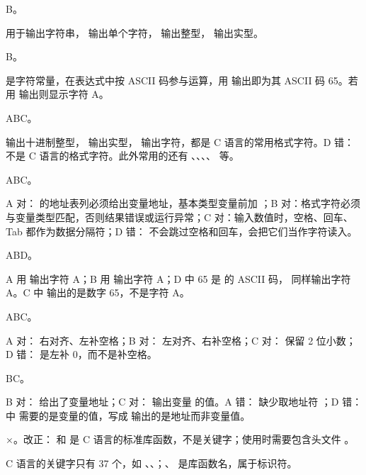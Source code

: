 \documentclass[a4paper,11pt]{article}
\begin{document}
\q B。\begin{analysis} 用于输出字符串， 输出单个字符， 输出整型， 输出实型。\end{analysis}

\q B。\begin{analysis} 是字符常量，在表达式中按 ASCII 码参与运算，用  输出即为其 ASCII 码 65。若用  输出则显示字符 A。\end{analysis}


\q ABC。\begin{analysis} 输出十进制整型， 输出实型， 输出字符，都是 C 语言的常用格式字符。D 错： 不是 C 语言的格式字符。此外常用的还有 、、、、 等。\end{analysis}

\q ABC。\begin{analysis}A 对： 的地址表列必须给出变量地址，基本类型变量前加 \code{\&}；B 对：格式字符必须与变量类型匹配，否则结果错误或运行异常；C 对：输入数值时，空格、回车、Tab 都作为数据分隔符；D 错： 不会跳过空格和回车，会把它们当作字符读入。\end{analysis}

\q ABD。\begin{analysis}A 用  输出字符 A；B 用  输出字符 A；D 中 65 是  的 ASCII 码， 同样输出字符 A。C 中  输出的是数字 65，不是字符 A。\end{analysis}

\q ABC。\begin{analysis}A 对： 右对齐、左补空格；B 对： 左对齐、右补空格；C 对： 保留 2 位小数；D 错： 是左补 0，而不是补空格。\end{analysis}

\q BC。\begin{analysis}B 对： 给出了变量地址；C 对： 输出变量  的值。A 错： 缺少取地址符 \code{\&}；D 错： 中  需要的是变量的值，写成  输出的是地址而非变量值。\end{analysis}


\q ×。改正： 和  是 C 语言的标准库函数，不是关键字；使用时需要包含头文件 。\begin{analysis}C 语言的关键字只有 37 个，如 、、；、 是库函数名，属于标识符。\end{analysis}
\end{document}
